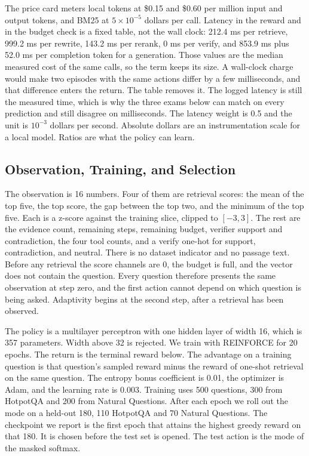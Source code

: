 \documentclass[letterpaper]{article} %
\begin{document}
The price card meters local tokens at \$0.15 and \$0.60 per million input and output tokens, and BM25 at \(5\times 10^{-5}\) dollars per call. Latency in the reward and in the budget check is a fixed table, not the wall clock: 212.4 ms per retrieve, 999.2 ms per rewrite, 143.2 ms per rerank, 0 ms per verify, and 853.9 ms plus 52.0 ms per completion token for a generation. Those values are the median measured cost of the same calls, so the term keeps its size. A wall-clock charge would make two episodes with the same actions differ by a few milliseconds, and that difference enters the return. The table removes it. The logged latency is still the measured time, which is why the three exams below can match on every prediction and still disagree on milliseconds. The latency weight is 0.5 and the unit is \(10^{-3}\) dollars per second. Absolute dollars are an instrumentation scale for a local model. Ratios are what the policy can learn.

\subsection{Observation, Training, and Selection}
The observation is 16 numbers. Four of them are retrieval scores: the mean of the top five, the top score, the gap between the top two, and the minimum of the top five. Each is a z-score against the training slice, clipped to \([-3, 3]\). The rest are the evidence count, remaining steps, remaining budget, verifier support and contradiction, the four tool counts, and a verify one-hot for support, contradiction, and neutral. There is no dataset indicator and no passage text. Before any retrieval the score channels are 0, the budget is full, and the vector does not contain the question. Every question therefore presents the same observation at step zero, and the first action cannot depend on which question is being asked. Adaptivity begins at the second step, after a retrieval has been observed.

The policy is a multilayer perceptron with one hidden layer of width 16, which is 357 parameters. Width above 32 is rejected. We train with REINFORCE \cite{williams1992reinforce} for 20 epochs. The return is the terminal reward below. The advantage on a training question is that question's sampled reward minus the reward of one-shot retrieval on the same question. The entropy bonus coefficient is 0.01, the optimizer is Adam, and the learning rate is 0.003. Training uses 500 questions, 300 from HotpotQA and 200 from Natural Questions. After each epoch we roll out the mode on a held-out 180, 110 HotpotQA and 70 Natural Questions. The checkpoint we report is the first epoch that attains the highest greedy reward on that 180. It is chosen before the test set is opened. The test action is the mode of the masked softmax.
\end{document}
